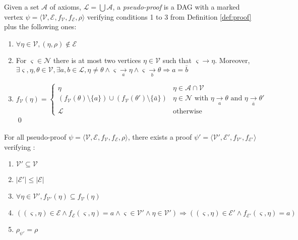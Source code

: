 \documentclass{llncs}
\newcommand{\dual}[1]{\ensuremath{\bar{#1}}}
\begin{document}
\begin{definition}
Given a set $\mathcal{A}$ of axioms, $\mathcal{L} = \bigcup{\mathcal{A}}$, a \emph{pseudo-proof} is
a DAG with a marked vertex $\psi = \langle \mathcal{V}, \mathcal{E}, f_\mathcal{V}, f_\mathcal{E},
\rho \rangle$ verifying conditions 1 to 3 from Definition \ref{def:proof} plus the following ones:
\begin{enumerate}[nosep,start=4]
  \item $\forall \eta \in \mathcal{V}, (\eta, \rho) \notin \mathcal{E}$
  \item For $\varsigma \in \mathcal{N}$ there is at most two vertices $\eta \in \mathcal{V}$ such
    that $\varsigma \rightarrow \eta$. Moreover, $\exists \varsigma, \eta, \theta \in \mathcal{V},
    \exists a, b \in \mathcal{L}, \eta \neq \theta \wedge \varsigma \xrightarrow[a]{} \eta \wedge
    \varsigma \xrightarrow[b]{} \theta \Rightarrow a = \dual{b}$
  \item %
    \begin{equation*}
      f_\mathcal{V}(\eta) = \begin{cases}
        \eta & \eta \in \mathcal{A} \cap \mathcal{V} \\
        \left(f_\mathcal{V}(\theta) \setminus \{a\}\right) \cup
        \left(f_\mathcal{V}(\theta') \setminus \{\dual{a}\}\right) &
              \eta \in \mathcal{N} \text{ with } \eta \xrightarrow[a]{} \theta \text{ and }
                                               \eta \xrightarrow[\dual{a}]{} \theta' \\
        \mathcal{L} & \text{otherwise}
      \end{cases}
    \end{equation*}
  \qed
\end{enumerate}
\end{definition}

\begin{proposition}
For all pseudo-proof $\psi = \langle \mathcal{V}, \mathcal{E}, f_\mathcal{V}, f_\mathcal{E}, \rho \rangle$,
there exists a proof $\psi' = \langle \mathcal{V}', \mathcal{E}', f_{\mathcal{V}'},
f_{\mathcal{E}'} \rangle$ verifying :
\begin{enumerate}[nosep]
  \item $\mathcal{V}' \subseteq \mathcal{V}$
  \item $|\mathcal{E}'| \leq |\mathcal{E}|$
  \item $\forall \eta \in \mathcal{V}', f_{\mathcal{V}'}(\eta) \subseteq f_\mathcal{V}(\eta)$
  \item $( (\varsigma,\eta) \in \mathcal{E} \wedge f_\mathcal{E}(\varsigma, \eta) = a \wedge
    \varsigma \in \mathcal{V}' \wedge \eta \in \mathcal{V}' ) \Rightarrow (
    (\varsigma,\eta) \in \mathcal{E}' \wedge f_{\mathcal{E}'}(\varsigma, \eta) = a )$
  \item $\rho_{\psi'} = \rho$
\end{enumerate}
\end{proposition}
\end{document}
